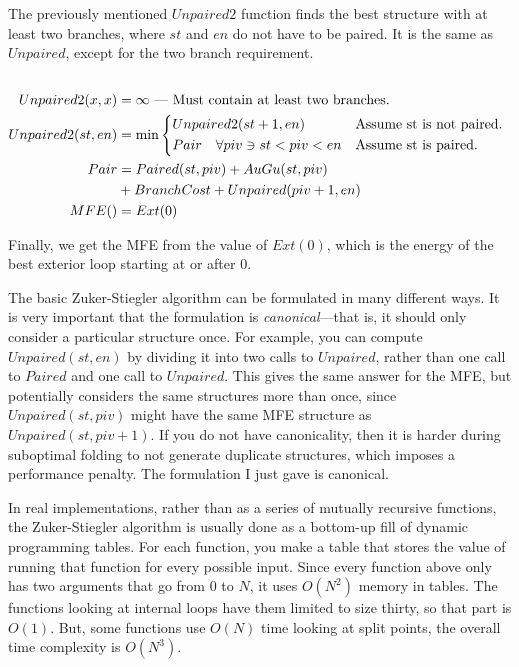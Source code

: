 \documentclass{cshonours}
\begin{document}
The previously mentioned $Unpaired2$ function finds the best structure with at least two branches, where $st$ and $en$ do not have to be paired. It is the same as $Unpaired$, except for the two branch requirement.
\begin{align*}
\text{}& \\
Unpaired2(x, x) &= \infty \text{ --- Must contain at least two branches.} \\
Unpaired2(st, en) &= \min{\begin{dcases*}
  Unpaired2(st + 1, en) & Assume st is not paired. \\
  Pair \quad \forall piv \ni st < piv < en & Assume st is paired. \\
\end{dcases*}} \\
Pair &= Paired(st, piv) + AuGu(st, piv)  \\
  &+ BranchCost + Unpaired(piv + 1, en) \\
MFE() &= Ext(0)
\end{align*}

Finally, we get the MFE from the value of $Ext(0)$, which is the energy of the best exterior loop starting at or after $0$. 

The basic Zuker-Stiegler algorithm can be formulated in many different ways. It is very important that the formulation is \emph{canonical}---that is, it should only consider a particular structure once. For example, you can compute $Unpaired(st, en)$ by dividing it into two calls to $Unpaired$, rather than one call to $Paired$ and one call to $Unpaired$. This gives the same answer for the MFE, but potentially considers the same structures more than once, since $Unpaired(st, piv)$ might have the same MFE structure as $Unpaired(st, piv + 1)$. If you do not have canonicality, then it is harder during suboptimal folding to not generate duplicate structures, which imposes a performance penalty. The formulation I just gave is canonical.

In real implementations, rather than as a series of mutually recursive functions, the Zuker-Stiegler algorithm is usually done as a bottom-up fill of dynamic programming tables. For each function, you make a table that stores the value of running that function for every possible input. Since every function above only has two arguments that go from $0$ to $N$, it uses $O(N^2)$ memory in tables. The functions looking at internal loops have them limited to size thirty, so that part is $O(1)$. But, some functions use $O(N)$ time looking at split points, the overall time complexity is $O(N^3)$.
\end{document}
